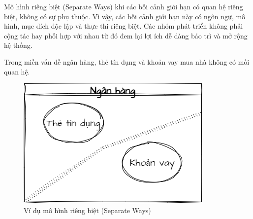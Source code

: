  Mô hình riêng biệt (Separate Ways) khi các bối cảnh giới hạn     có quan hệ riêng biệt, không có sự phụ thuộc. Vì vậy,  các   bối cảnh giới hạn   này     có  ngôn ngữ,  mô hình,  mục đích độc lập  và        thực thi riêng biệt.  Các nhóm phát triển không phải cộng tác hay phối hợp  với nhau từ đó   đem lại lợi ích  dễ dàng bảo trì và mở rộng hệ thống.

\begin{example} Trong miền vấn đề ngân hàng,     thẻ tín dụng và khoản vay mua nhà không có mối quan hệ. 
    
\begin{figure}[H]

    \centering
    
    \includegraphics[scale = 0.5]{pictures/mo_hinh_rieng_biet_separate_ways/main.drawio.png}
    
    \caption{Ví dụ  mô hình riêng biệt (Separate Ways)  }
    
    \end{figure}
\end{example} 
